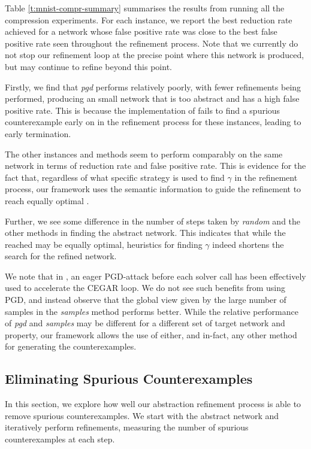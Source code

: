 Table \ref{t:mnist-compr-summary} summarises the results from running all the
\mnist compression experiments. For each instance, we report the best reduction
rate achieved for a network whose false positive rate was close to the best
false positive rate seen
throughout the refinement process. Note that we currently do not stop our
refinement loop at the precise point where this network is produced, but may
continue to refine beyond this point.

Firstly, we find that \textit{pgd} performs relatively poorly, with fewer
refinements being performed, producing an small network that is too abstract and
has a high false positive rate. This is because the \abcrown
implementation of \pgd fails to find a spurious counterexample early on in the
refinement process for these instances, leading to early termination. 

The other instances and methods seem to perform
comparably on the same network in terms of reduction rate and false positive
rate. This is evidence for the fact that, regardless of what specific strategy
is used to find $\gamma$ in the refinement process, our framework uses the
semantic information to guide the refinement to reach equally optimal \abs.

Further, we see some difference in the number of steps taken by \textit{random}
and the other methods in finding the abstract network. This indicates that while
the \abs reached may be equally optimal, 
heuristics for finding $\gamma$ indeed
shortens the search for the refined network.

We note that in \cite{cleverest-nn}, an eager PGD-attack before each solver call
has been effectively used to accelerate the CEGAR loop. We do not see such
benefits from using PGD, and instead observe that the global view given by
the large number of samples in the \textit{samples} method performs better.
While the relative performance of \textit{pgd} and \textit{samples} may be
different for a different set of target network and property, our framework
allows the use of either, and in-fact, any other method for generating the
counterexamples.

\subsection{Eliminating Spurious Counterexamples}
\label{s:exp-mnist-rob}

In this section, we explore how well our abstraction refinement process is able
to remove spurious counterexamples. We start with the abstract network and
iteratively perform refinements, measuring the number of spurious
counterexamples at each step. 

